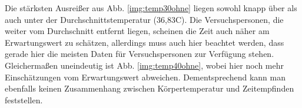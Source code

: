 \documentclass{Paper}
\begin{document}


 
Die stärksten Ausreißer aus Abb. \ref{img:temp30ohne} liegen sowohl knapp über als auch unter der Durchschnittstemperatur (36,83\textdegree C). Die Versuchspersonen, die weiter vom Durchschnitt entfernt liegen, scheinen die Zeit auch näher am Erwartungswert zu schätzen, allerdings muss auch hier beachtet werden, dass gerade hier die meisten Daten für Versuchspersonen zur Verfügung stehen. 
Gleichermaßen uneindeutig ist Abb. \ref{img:temp40ohne}, wobei hier noch mehr Einschätzungen vom Erwartungswert abweichen. 	
Dementsprechend kann man ebenfalls keinen Zusammenhang zwischen Körpertemperatur und Zeitempfinden feststellen. 


\end{document}
